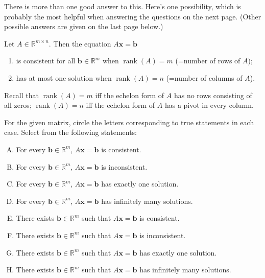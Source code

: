 \documentclass[answers,addpoints,12pt]{exam}
\theoremstyle{remark}
\renewcommand{\vec}[1]{\mathbf{#1}}
\newcommand\rank{\ensuremath{\operatorname{rank}}}
\newcommand{\<}{\ensuremath{\langle}}
\renewcommand{\>}{\ensuremath{\rangle}}
\newcommand{\R}{\ensuremath{\mathbb{R}}}
\newcommand\vb{\vec{b}}
\newcommand\vx{\vec{x}}
\begin{document}
\begin{questions}
\begin{solution}
There is more than one good answer to this.  Here's one possibility, which is probably the most
helpful when answering the questions on the next page.  
(Other possible answers are given on the last page below.)

Let $A\in \R^{m\times n}$. Then the equation $A\vx = \vb$ 
\begin{enumerate}
\item is consistent for all $\vb \in \R^m$ when $\rank(A)=m$ (=number of rows of $A$);
\item has at most one solution when $\rank(A)=n$ (=number of columns of $A$).
\end{enumerate}
Recall that $\rank(A)=m$ iff the echelon form of $A$ has 
no rows consisting of all zeros; 
$\rank(A)=n$ iff the echelon form of $A$ has 
a pivot in every column.

\end{solution}


\newpage


\question For the given matrix, circle the letters corresponding to true statements in each case.
Select from the following statements:
\begin{enumerate}[A.]
        \item For every $\vb \in \R^m$, $A\vx = \vb$ is consistent.
        \item For every $\vb \in \R^m$, $A\vx = \vb$ is inconsistent.
        \item For every $\vb \in \R^m$, $A\vx = \vb$ has exactly one solution.
        \item For every $\vb \in \R^m$, $A\vx = \vb$ has infinitely many solutions.
        \item There exists $\vb \in \R^m$ such that $A\vx = \vb$ is consistent.
        \item There exists $\vb \in \R^m$ such that $A\vx = \vb$ is inconsistent.
        \item There exists $\vb \in \R^m$ such that $A\vx = \vb$ has exactly one solution.
        \item There exists $\vb \in \R^m$ such that $A\vx = \vb$ has infinitely many solutions.
\end{enumerate}
\begin{parts}

\end{parts}
\end{questions}
\end{document}
